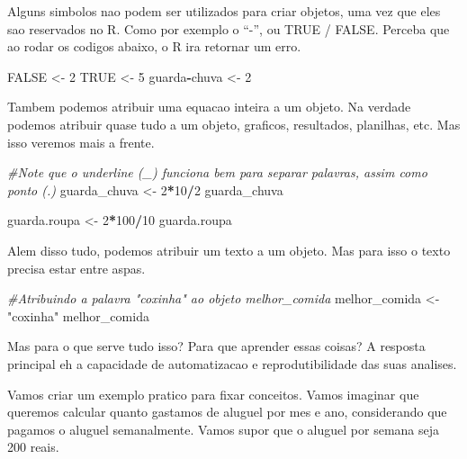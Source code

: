 \documentclass[
]{book}
\newenvironment{Shaded}{\begin{snugshade}}{\end{snugshade}}
\newcommand{\CommentTok}[1]{\textcolor[rgb]{0.56,0.35,0.01}{\textit{#1}}}
\newcommand{\ConstantTok}[1]{\textcolor[rgb]{0.56,0.35,0.01}{#1}}
\newcommand{\DecValTok}[1]{\textcolor[rgb]{0.00,0.00,0.81}{#1}}
\newcommand{\NormalTok}[1]{#1}
\newcommand{\OtherTok}[1]{\textcolor[rgb]{0.56,0.35,0.01}{#1}}
\newcommand{\SpecialCharTok}[1]{\textcolor[rgb]{0.81,0.36,0.00}{\textbf{#1}}}
\newcommand{\StringTok}[1]{\textcolor[rgb]{0.31,0.60,0.02}{#1}}
\begin{document}
Alguns simbolos nao podem ser utilizados para criar objetos, uma vez que eles sao reservados no R. Como por exemplo o ``-'', ou TRUE / FALSE. Perceba que ao rodar os codigos abaixo, o R ira retornar um erro.

\begin{Shaded}
\begin{Highlighting}[]
\ConstantTok{FALSE} \OtherTok{\textless{}{-}} \DecValTok{2}
\ConstantTok{TRUE} \OtherTok{\textless{}{-}} \DecValTok{5}
\NormalTok{guarda}\SpecialCharTok{{-}}\NormalTok{chuva }\OtherTok{\textless{}{-}} \DecValTok{2}
\end{Highlighting}
\end{Shaded}

Tambem podemos atribuir uma equacao inteira a um objeto. Na verdade podemos atribuir quase tudo a um objeto, graficos, resultados, planilhas, etc. Mas isso veremos mais a frente.

\begin{Shaded}
\begin{Highlighting}[]
\CommentTok{\#Note que o underline (\_) funciona bem para separar palavras, assim como ponto (.)}
\NormalTok{guarda\_chuva }\OtherTok{\textless{}{-}} \DecValTok{2}\SpecialCharTok{*}\DecValTok{10}\SpecialCharTok{/}\DecValTok{2}
\NormalTok{guarda\_chuva}

\NormalTok{guarda.roupa }\OtherTok{\textless{}{-}} \DecValTok{2}\SpecialCharTok{*}\DecValTok{100}\SpecialCharTok{/}\DecValTok{10}
\NormalTok{guarda.roupa}
\end{Highlighting}
\end{Shaded}

Alem disso tudo, podemos atribuir um texto a um objeto. Mas para isso o texto precisa estar entre aspas.

\begin{Shaded}
\begin{Highlighting}[]
\CommentTok{\#Atribuindo a palavra "coxinha" ao objeto melhor\_comida}
\NormalTok{melhor\_comida }\OtherTok{\textless{}{-}} \StringTok{"coxinha"}
\NormalTok{melhor\_comida}
\end{Highlighting}
\end{Shaded}

Mas para o que serve tudo isso? Para que aprender essas coisas? A resposta principal eh a capacidade de automatizacao e reprodutibilidade das suas analises.

Vamos criar um exemplo pratico para fixar conceitos. Vamos imaginar que queremos calcular quanto gastamos de aluguel por mes e ano, considerando que pagamos o aluguel semanalmente. Vamos supor que o aluguel por semana seja 200 reais.
\end{document}

